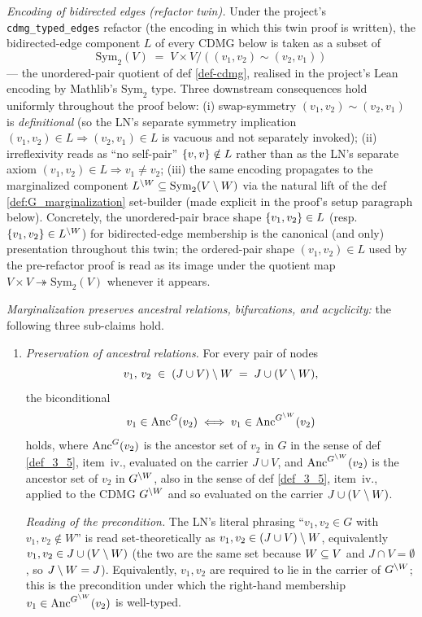 \documentclass[main]{subfiles}
\begin{document}
\begin{Rem}[MargPreservesAncestors]
    \emph{Encoding of bidirected edges (refactor twin).}
    Under the project's \texttt{cdmg\_typed\_edges} refactor (the encoding in which this twin proof is written), the bidirected-edge component $L$ of every CDMG below is taken as a subset of
    \[
        \text{Sym}_2(V) \;=\; V \times V / ((v_1, v_2) \sim (v_2, v_1))
    \]
    --- the unordered-pair quotient of def \ref{def-cdmg}, realised in the project's Lean encoding by Mathlib's $\text{Sym}_2$ type. Three downstream consequences hold uniformly throughout the proof below: (i) swap-symmetry $(v_1, v_2) \sim (v_2, v_1)$ is \emph{definitional} (so the LN's separate symmetry implication $(v_1, v_2) \in L \Rightarrow (v_2, v_1) \in L$ is vacuous and not separately invoked); (ii) irreflexivity reads as ``no self-pair'' $\left \{ v, v \right \} \notin L$ rather than as the LN's separate axiom $(v_1, v_2) \in L \Rightarrow v_1 \neq v_2$; (iii) the same encoding propagates to the marginalized component $L^{\setminus W} \subseteq \text{Sym}_2(V \setminus W)$ via the natural lift of the def \ref{def:G_marginalization} set-builder (made explicit in the proof's setup paragraph below). Concretely, the unordered-pair brace shape $\left \{ v_1, v_2 \right \} \in L$ (resp.\ $\left \{ v_1, v_2 \right \} \in L^{\setminus W}$) for bidirected-edge membership is the canonical (and only) presentation throughout this twin; the ordered-pair shape $(v_1, v_2) \in L$ used by the pre-refactor proof is read as its image under the quotient map $V \times V \twoheadrightarrow \text{Sym}_2(V)$ whenever it appears.

    \emph{Marginalization preserves ancestral relations, bifurcations, and acyclicity:} the following three sub-claims hold.

    \begin{enumerate}[label=\roman*.)]
        \item \emph{Preservation of ancestral relations.}
            For every pair of nodes
            \[
                v_1,\, v_2 \;\in\; (J \cup V) \setminus W \;=\; J \cup (V \setminus W),
            \]
            the biconditional
            \[
                v_1 \in \mathrm{Anc}^G(v_2) \;\Longleftrightarrow\; v_1 \in \mathrm{Anc}^{G^{\setminus W}}(v_2)
            \]
            holds, where $\mathrm{Anc}^G(v_2)$ is the ancestor set of $v_2$ in $G$ in the sense of def \ref{def_3_5}, item~iv., evaluated on the carrier $J \cup V$, and $\mathrm{Anc}^{G^{\setminus W}}(v_2)$ is the ancestor set of $v_2$ in $G^{\setminus W}$, also in the sense of def \ref{def_3_5}, item~iv., applied to the CDMG $G^{\setminus W}$ and so evaluated on the carrier $J \cup (V \setminus W)$.

            \emph{Reading of the precondition.} The LN's literal phrasing ``$v_1, v_2 \in G$ with $v_1, v_2 \notin W$'' is read set-theoretically as $v_1, v_2 \in (J \cup V) \setminus W$, equivalently $v_1, v_2 \in J \cup (V \setminus W)$ (the two are the same set because $W \subseteq V$ and $J \cap V = \emptyset$, so $J \setminus W = J$). Equivalently, $v_1, v_2$ are required to lie in the carrier of $G^{\setminus W}$; this is the precondition under which the right-hand membership $v_1 \in \mathrm{Anc}^{G^{\setminus W}}(v_2)$ is well-typed.


\end{enumerate}
\end{Rem}
\end{document}
